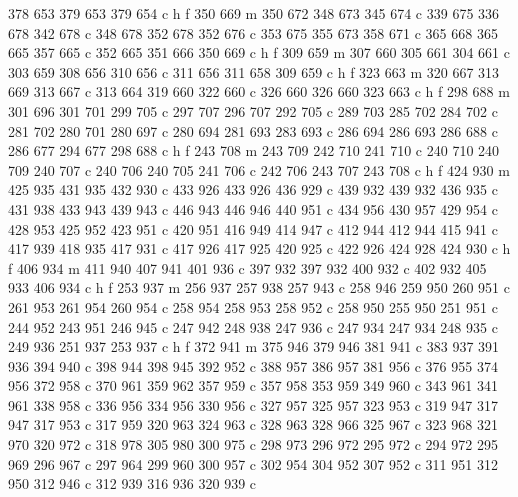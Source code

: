 {{        378 653 379 653 379 654 c
        h f
        350 669 m
        350 672 348 673 345 674 c
        339 675 336 678 342 678 c
        348 678 352 678 352 676 c
        353 675 355 673 358 671 c
        365 668 365 665 357 665 c
        352 665 351 666 350 669 c
        h f
        309 659 m
        307 660 305 661 304 661 c
        303 659 308 656 310 656 c
        311 656 311 658 309 659 c
        h f
        323 663 m
        320 667 313 669 313 667 c
        313 664 319 660 322 660 c
        326 660 326 660 323 663 c
        h f
        298 688 m
        301 696 301 701 299 705 c
        297 707 296 707 292 705 c
        289 703 285 702 284 702 c
        281 702 280 701 280 697 c
        280 694 281 693 283 693 c
        286 694 286 693 286 688 c
        286 677 294 677 298 688 c
        h f
        243 708 m
        243 709 242 710 241 710 c
        240 710 240 709 240 707 c
        240 706 240 705 241 706 c
        242 706 243 707 243 708 c
        h f
        424 930 m
        425 935 431 935 432 930 c
        433 926 433 926 436 929 c
        439 932 439 932 436 935 c
        431 938 433 943 439 943 c
        446 943 446 946 440 951 c
        434 956 430 957 429 954 c
        428 953 425 952 423 951 c
        420 951 416 949 414 947 c
        412 944 412 944 415 941 c
        417 939 418 935 417 931 c
        417 926 417 925 420 925 c
        422 926 424 928 424 930 c
        h f
        406 934 m
        411 940 407 941 401 936 c
        397 932 397 932 400 932 c
        402 932 405 933 406 934 c
        h f
        253 937 m
        256 937 257 938 257 943 c
        258 946 259 950 260 951 c
        261 953 261 954 260 954 c
        258 954 258 953 258 952 c
        258 950 255 950 251 951 c
        244 952 243 951 246 945 c
        247 942 248 938 247 936 c
        247 934 247 934 248 935 c
        249 936 251 937 253 937 c
        h f
        372 941 m
        375 946 379 946 381 941 c
        383 937 391 936 394 940 c
        398 944 398 945 392 952 c
        388 957 386 957 381 956 c
        376 955 374 956 372 958 c
        370 961 359 962 357 959 c
        357 958 353 959 349 960 c
        343 961 341 961 338 958 c
        336 956 334 956 330 956 c
        327 957 325 957 323 953 c
        319 947 317 947 317 953 c
        317 959 320 963 324 963 c
        328 963 328 966 325 967 c
        323 968 321 970 320 972 c
        318 978 305 980 300 975 c
        298 973 296 972 295 972 c
        294 972 295 969 296 967 c
        297 964 299 960 300 957 c
        302 954 304 952 307 952 c
        311 951 312 950 312 946 c
        312 939 316 936 320 939 c
}}
